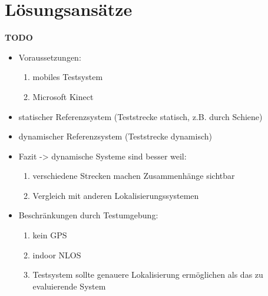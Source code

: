 \section{Lösungsansätze}
\label{sec:loesungsansaetze}

\textbf{TODO}
\begin{itemize}
  \item Voraussetzungen:
    \begin{enumerate}
      \item mobiles Testsystem
      \item Microsoft Kinect
    \end{enumerate}
  \item statischer Referenzsystem (Teststrecke statisch, z.B. durch Schiene)
  \item dynamischer Referenzsystem (Teststrecke dynamisch)
  \item Fazit -> dynamische Systeme sind besser weil:
    \begin{enumerate}
      \item verschiedene Strecken machen Zusammenhänge sichtbar
      \item Vergleich mit anderen Lokalisierungssystemen
    \end{enumerate}
  \item Beschränkungen durch Testumgebung:
    \begin{enumerate}
      \item kein GPS
      \item indoor NLOS
      \item Testsystem sollte genauere Lokalisierung ermöglichen als das zu evaluierende System
    \end{enumerate}
\end{itemize}


